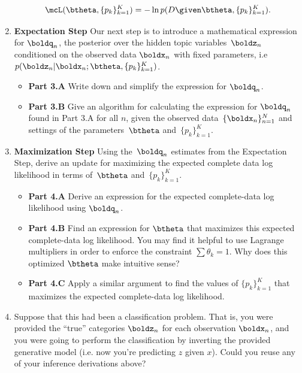\documentclass[submit]{harvardml}
\begin{document}
\begin{problem}
\begin{enumerate}
\[\mcL(\btheta, \{p_k\}^K_{k=1}) =  -\ln p(D \given\btheta, \{p_k\}^K_{k=1}).\]


\item \textbf{Expectation Step} Our next step is to introduce a
  mathematical expression for $\boldq_n$, the posterior over the
  hidden topic variables~$\boldz_n$ conditioned on the observed data
  $\boldx_n$ with fixed parameters, i.e $p(\boldz_n | \boldx_n;
  \btheta, \{ p_k \}^K_{k=1})$.

\begin{itemize}
\item  \textbf{Part 3.A } Write down and simplify the expression for $\boldq_n$.
\item  \textbf{Part 3.B } Give an algorithm for calculating the expression for $\boldq_n$ found in Part 3.A for all $n$, given the observed data~$\{\boldx_n\}^N_{n=1}$ and settings of the parameters~$\btheta$ and~$\{ p_k\}^K_{k=1}$.

\end{itemize}

\item \textbf{Maximization Step}
Using the~$\boldq_n$ estimates from the Expectation Step, derive an update for maximizing the expected complete data log likelihood in terms of~$\btheta$ and~$\{ p_k \}^K_{k=1}$.

\begin{itemize}
    \item \textbf{Part 4.A } Derive an expression for the expected complete-data log likelihood using $\boldq_n$.
    \item \textbf{Part 4.B } Find an expression for $\btheta$ that maximizes this expected complete-data log likelihood. You may find it helpful to use Lagrange multipliers in order to enforce the constraint $\sum \theta_k = 1$. Why does this optimized $\btheta$ make intuitive sense?
    \item \textbf{Part 4.C } Apply a similar argument to find the
      values of $\{p_k \}^K_{k = 1}$ that maximizes the expected
      complete-data log likelihood.
\end{itemize}

\item Suppose that this had been a classification problem. That is,
  you were provided the ``true'' categories $\boldz_n$ for each observation $\boldx_n$,
  and you were going to perform the classification by
  inverting the provided generative model (i.e. now you're predicting $z$ given $x$). Could you reuse any of
  your inference derivations above?


\end{enumerate}
\end{problem}
\end{document}
